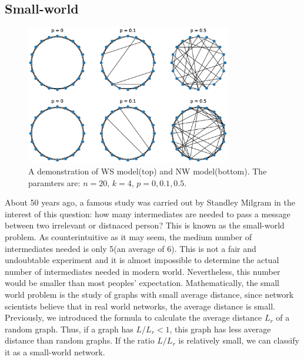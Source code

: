 \documentclass[12pt]{article}
\begin{document}
\subsection{Small-world}
\label{small_world}

\begin{figure}[h]
    \includegraphics[width = 0.8\textwidth]{small_world_network_model.eps}
    \centering
    \caption{A demonstration of WS model(top) and NW model(bottom). The paramters are: $n=20$, $k=4$, $p=0,0.1,0.5$.}
    \label{fig:small_world_models}
\end{figure}
About 50 years ago, a famous study was carried out by Standley Milgram\cite{milgram1967small} in the interest of this question: how many intermediates are needed to pass a message between two irrelevant or distnaced person? This is known as the small-world problem. As counterintuitive as it may seem, the medium number of intermediates needed is only 5(an average of 6). This is not a fair and undoubtable experiment and it is almost impossible to determine the actual number of intermediates needed in modern world. Nevertheless, this number would be smaller than most peoples' expectation. Mathematically, the small world problem is the study of graphs with small average distance, since network scientists believe that in real world networks, the average distance is small. Previously, we introduced the formula to calculate the average distance $L_r$ of a random graph. Thus, if a graph has $L/L_r <1$, this graph has less average distance than random graphs. If the ratio $L/L_r$ is relatively small, we can classify it as a small-world network.\\
\noindent
\end{document}
